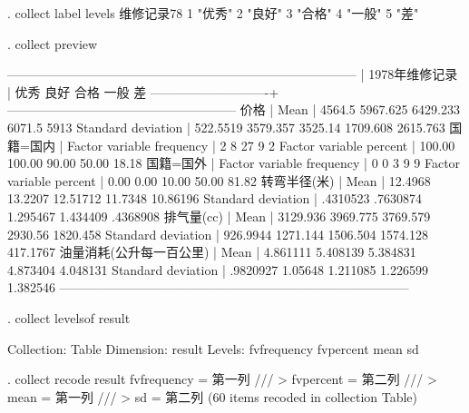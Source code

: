 \documentclass{ctexart}
\begin{document}
. collect label levels 维修记录78 1 "优秀" 2 "良好" 3 "合格" 4 "一般" 5 "差"

. collect preview

-----------------------------------------------------------------------------------
                            |                     1978年维修记录                   
                            |      优秀       良好       合格       一般         差
----------------------------+------------------------------------------------------
价格                        |                                                      
  Mean                      |    4564.5   5967.625   6429.233     6071.5       5913
  Standard deviation        |  522.5519   3579.357    3525.14   1709.608   2615.763
国籍=国内                   |                                                      
  Factor variable frequency |         2          8         27          9          2
  Factor variable percent   |    100.00     100.00      90.00      50.00      18.18
国籍=国外                   |                                                      
  Factor variable frequency |         0          0          3          9          9
  Factor variable percent   |      0.00       0.00      10.00      50.00      81.82
转弯半径(米)                |                                                      
  Mean                      |   12.4968    13.2207   12.51712    11.7348   10.86196
  Standard deviation        |  .4310523   .7630874   1.295467   1.434409   .4368908
排气量(cc)                  |                                                      
  Mean                      |  3129.936   3969.775   3769.579    2930.56   1820.458
  Standard deviation        |  926.9944   1271.144   1506.504   1574.128   417.1767
油量消耗(公升每一百公里)    |                                                      
  Mean                      |  4.861111   5.408139   5.384831   4.873404   4.048131
  Standard deviation        |  .9820927    1.05648   1.211085   1.226599   1.382546
-----------------------------------------------------------------------------------

. collect levelsof result

Collection: Table
 Dimension: result
    Levels: fvfrequency fvpercent mean sd

. collect recode result fvfrequency = 第一列 ///
>                       fvpercent   = 第二列 ///
>                       mean        = 第一列 ///
>                       sd          = 第二列
(60 items recoded in collection Table)
\end{document}
